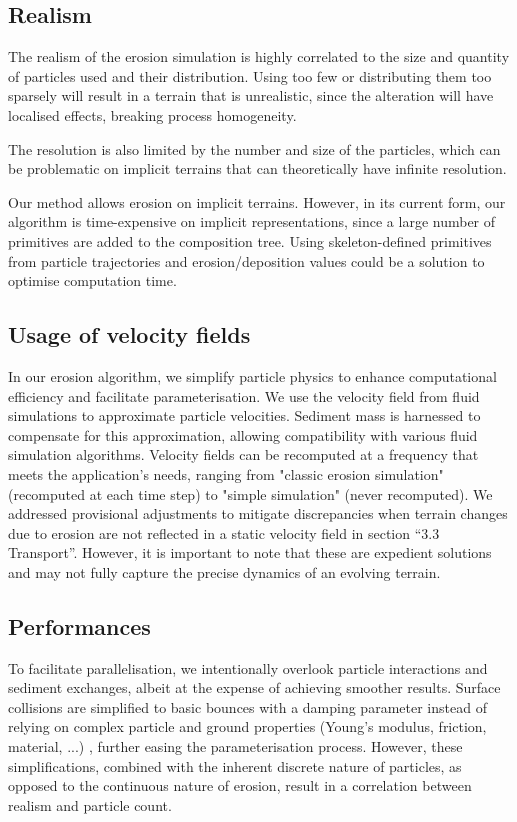\subsection{Realism}
The realism of the erosion simulation is highly correlated to the size and quantity of particles used and their distribution. Using too few or distributing them too sparsely will result in a terrain that is unrealistic, since the alteration will have localised effects, breaking process homogeneity.

The resolution is also limited by the number and size of the particles, which can be problematic on implicit terrains that can theoretically have infinite resolution.

Our method allows erosion on implicit terrains. However, in its current form, our algorithm is time-expensive on implicit representations, since a large number of primitives are added to the composition tree. Using skeleton-defined primitives \cite{Hong2013, Rigaudiere2000} from particle trajectories and erosion/deposition values could be a solution to optimise computation time.

\subsection{Usage of velocity fields}
In our erosion algorithm, we simplify particle physics to enhance computational efficiency and facilitate parameterisation. We use the velocity field from fluid simulations to approximate particle velocities. Sediment mass is harnessed to compensate for this approximation, allowing compatibility with various fluid simulation algorithms. Velocity fields can be recomputed at a frequency that meets the application's needs, ranging from "classic erosion simulation" (recomputed at each time step) to "simple simulation" (never recomputed). We addressed provisional adjustments to mitigate discrepancies when terrain changes due to erosion are not reflected in a static velocity field in section “3.3 Transport”. However, it is important to note that these are expedient solutions and may not fully capture the precise dynamics of an evolving terrain.

\subsection{Performances}
To facilitate parallelisation, we intentionally overlook particle interactions and sediment exchanges, albeit at the expense of achieving smoother results. Surface collisions are simplified to basic bounces with a damping parameter instead of relying on complex particle and ground properties (Young's modulus, friction, material, ...) \cite{Yan2020}, further easing the parameterisation process. However, these simplifications, combined with the inherent discrete nature of particles, as opposed to the continuous nature of erosion, result in a correlation between realism and particle count.


